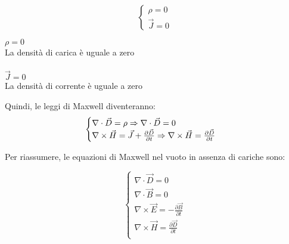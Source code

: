 { \Large \begin{equation}
    \begin{cases}
    
        \rho = 0 \\ 
        \vec{J} = 0  

    \end{cases}
\end{equation}}

\begin{tcolorbox}

    $\rho = 0$ \\
    La densità di carica è uguale a zero \\ \\ 

    $\vec{J} = 0$\\ 
    La densità di corrente è uguale a zero 

\end{tcolorbox}


Quindi, le leggi di Maxwell diventeranno: \\ 


{  \Large \begin{equation}
    \begin{cases}
        \nabla \cdot \vec{D} = \rho \Rightarrow \nabla \cdot \vec{D} = 0  \\
        \nabla \times \vec{H} = \vec{J} + \frac{\partial \vec{D}}{\partial t} 
        \Rightarrow \nabla \times \vec{H} = \frac{\partial \vec{D}}{\partial t} \newline 
        
    \end{cases}
\end{equation}}

Per riassumere, le equazioni di Maxwell nel vuoto in assenza di cariche sono: 

{ \Large \begin{equation}
    \begin{cases}
    
        \nabla \cdot \vec{D} = 0 \\
        \nabla \cdot \vec{B} = 0 \\
        \nabla \times \vec{E} = -\frac{\partial \vec{B}}{\partial t} \\
        \nabla \times \vec{H} = \frac{\partial \vec{D}}{\partial t} \\ 

    \end{cases}
\end{equation}}

